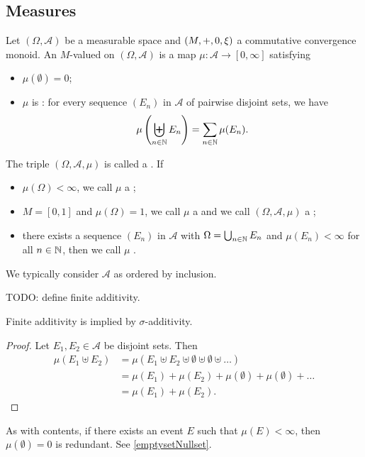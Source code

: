 \subsection{Measures}
\begin{definition}
Let $(\Omega,\mathcal{A})$ be a measurable space and $\left( M,+,0,\xi \right)$ a commutative convergence monoid. An $M$-valued  on $(\Omega,\mathcal{A})$ is a map $\mu: \mathcal{A} \to [0,\infty]$ satisfying
\begin{itemize}
\item $\mu(\emptyset) = 0$;
\item $\mu$ is : for every sequence $(E_n)$ in $\mathcal{A}$ of pairwise disjoint sets, we have
\[ \mu\left(\biguplus_{n\in\mathbb{N}}E_n\right) = \sum_{n\in\mathbb{N}}\mu(E_n). \]
\end{itemize}
The triple $(\Omega, \mathcal{A}, \mu)$ is called a . If
\begin{itemize}
\item $\mu(\Omega) < \infty$, we call $\mu$ a ;
\item $M = [0,1]$ and $\mu(\Omega) = 1$, we call $\mu$ a  and we call $(\Omega, \mathcal{A}, \mu)$ a ;
\item there exists a sequence $(E_n)$ in $\mathcal{A}$ with $\Omega = \bigcup_{n\in\mathbb{N}}E_n$ and $\mu(E_n)<\infty$ for all $n\in\mathbb{N}$, then we call $\mu$ .
\end{itemize}
\end{definition}
We typically consider $\mathcal{A}$ as ordered by inclusion.

TODO: define finite additivity.

\begin{lemma}
Finite additivity is implied by $\sigma$-additivity.
\end{lemma}
\begin{proof}
Let $E_1,E_2\in\mathcal{A}$ be disjoint sets. Then
\begin{align*}
\mu(E_1\uplus E_2) &= \mu(E_1\uplus E_2 \uplus \emptyset \uplus \emptyset \uplus \ldots) \\
&= \mu(E_1) + \mu(E_2) + \mu(\emptyset) + \mu(\emptyset) + \ldots \\
&= \mu(E_1) + \mu(E_2).
\end{align*}
\end{proof}

As with contents, if there exists an event $E$ such that $\mu(E)< \infty$, then $\mu(\emptyset) = 0$ is redundant. See \ref{emptysetNullset}.

